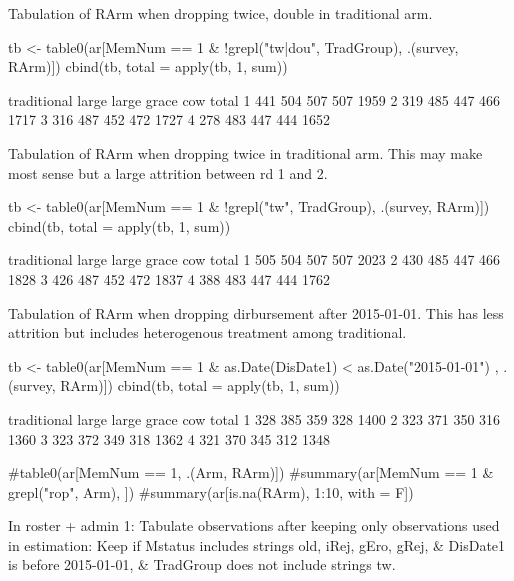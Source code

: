 Tabulation of \textsf{RArm} when dropping \textsf{twice, double} in traditional arm.
\begin{Schunk}
\begin{Sinput}
tb <- table0(ar[MemNum == 1 & !grepl("tw|dou", TradGroup), .(survey, RArm)])
cbind(tb, total = apply(tb, 1, sum))
\end{Sinput}
\begin{Soutput}
  traditional large large grace cow total
1         441   504         507 507  1959
2         319   485         447 466  1717
3         316   487         452 472  1727
4         278   483         447 444  1652
\end{Soutput}
\end{Schunk}
Tabulation of \textsf{RArm} when dropping \textsf{twice} in traditional arm. This may make most sense but a large attrition between rd 1 and 2.
\begin{Schunk}
\begin{Sinput}
tb <- table0(ar[MemNum == 1 & !grepl("tw", TradGroup), .(survey, RArm)])
cbind(tb, total = apply(tb, 1, sum))
\end{Sinput}
\begin{Soutput}
  traditional large large grace cow total
1         505   504         507 507  2023
2         430   485         447 466  1828
3         426   487         452 472  1837
4         388   483         447 444  1762
\end{Soutput}
\end{Schunk}
Tabulation of \textsf{RArm} when dropping dirbursement after 2015-01-01. This has less attrition but includes heterogenous treatment among traditional.
\begin{Schunk}
\begin{Sinput}
tb <- table0(ar[MemNum == 1 & as.Date(DisDate1) < as.Date("2015-01-01") , .(survey, RArm)])
cbind(tb, total = apply(tb, 1, sum))
\end{Sinput}
\begin{Soutput}
  traditional large large grace cow total
1         328   385         359 328  1400
2         323   371         350 316  1360
3         323   372         349 318  1362
4         321   370         345 312  1348
\end{Soutput}
\begin{Sinput}
#table0(ar[MemNum == 1, .(Arm, RArm)])
#summary(ar[MemNum == 1 & grepl("rop", Arm), ])
#summary(ar[is.na(RArm), 1:10, with = F])
\end{Sinput}
\end{Schunk}
In \textsf{roster + admin} 1: Tabulate observations after keeping only observations used in estimation: Keep if \textsf{Mstatus} includes strings old, iRej, gEro, gRej, \& \textsf{DisDate1} is before 2015-01-01, \& \textsf{TradGroup} does not include strings tw.
